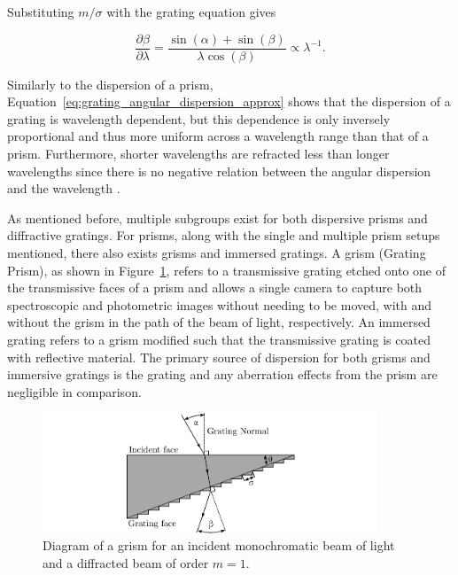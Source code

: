 \noindent Substituting $m / \sigma$ with the grating equation gives

\begin{equation}
  \frac{\partial \beta}{\partial \lambda} = \frac{\sin(\alpha) + \sin(\beta)}{\lambda \cos(\beta)} \propto \lambda^{-1}.
  \label{eq:grating_angular_dispersion_approx}
\end{equation}

Similarly to the dispersion of a prism, Equation~\ref{eq:grating_angular_dispersion_approx} shows that the dispersion of a grating is wavelength dependent, but this dependence is only inversely proportional and thus more uniform across a wavelength range than that of a prism. Furthermore, shorter wavelengths are refracted less than longer wavelengths since there is no negative relation between the angular dispersion and the wavelength \citep{BirneyObsAstro, Hecht_optics}.
\prgph

As mentioned before, multiple subgroups exist for both dispersive prisms and diffractive gratings. For prisms, along with the single and multiple prism setups mentioned, there also exists grisms and immersed gratings. A grism (Grating Prism), as shown in Figure~\ref{fig:grism}, refers to a transmissive grating etched onto one of the transmissive faces of a prism and allows a single camera to capture both spectroscopic and photometric images without needing to be moved, with and without the grism in the path of the beam of light, respectively. An immersed grating refers to a grism modified such that the transmissive grating is coated with reflective material. The primary source of dispersion for both grisms and immersive gratings is the grating and any aberration effects from the prism are negligible in comparison.
\prgph

\begin{figure}[t]
  \centering
  \includegraphics[width = 10cm]{figures/2_grism.pdf}
  \caption{Diagram of a grism for an incident monochromatic beam of light and a diffracted beam of order $m = 1$.}
  \label{fig:grism}
\end{figure}

